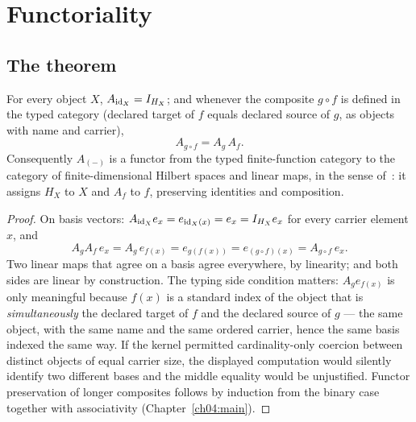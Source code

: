 \section{Functoriality}\label{ch07:sec:functor}

\subsection{The theorem}

\begin{theorem}\label{ch07:thm:functor}
For every object $X$, $A_{\mathrm{id}_X}=I_{H_X}$; and whenever the composite
$g\circ f$ is defined in the typed category (declared target of $f$ equals
declared source of $g$, as objects with name and carrier),
\[
A_{g\circ f}=A_g\,A_f .
\]
Consequently $A_{(-)}$ is a functor from the typed finite-function category
to the category of finite-dimensional Hilbert spaces and linear maps, in the
sense of~\cite{maclanecwm}: it assigns $H_X$ to $X$ and $A_f$ to $f$,
preserving identities and composition.
\end{theorem}

\begin{proof}
On basis vectors: $A_{\mathrm{id}_X}e_x=e_{\mathrm{id}_X(x)}=e_x=I_{H_X}e_x$ for every
carrier element $x$, and
\[
A_gA_f\,e_x = A_g\,e_{f(x)} = e_{g(f(x))} = e_{(g\circ f)(x)}
= A_{g\circ f}\,e_x .
\]
Two linear maps that agree on a basis agree everywhere, by linearity; and
both sides are linear by construction. The typing side condition matters:
$A_ge_{f(x)}$ is only meaningful because $f(x)$ is a standard index of the
object that is \emph{simultaneously} the declared target of $f$ and the
declared source of $g$ --- the same object, with the same name and the same
ordered carrier, hence the same basis indexed the same way. If the kernel
permitted cardinality-only coercion between distinct objects of equal
carrier size, the displayed computation would silently identify two
different bases and the middle equality would be unjustified. Functor
preservation of longer composites follows by induction from the binary case
together with associativity (Chapter~\ref{ch04:main}).
\end{proof}

